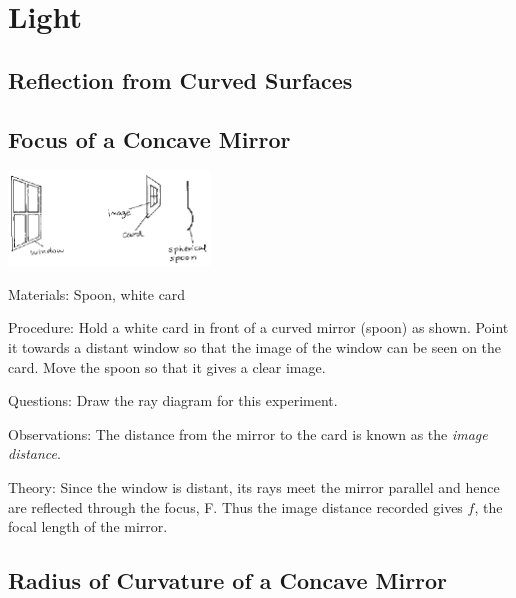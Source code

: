 \section{Light}

\begin{multicols}{2}


\section*{Reflection from Curved Surfaces}


\subsection{Focus of a Concave Mirror}

\begin{center}
\includegraphics[width=0.4\textwidth]{./img/source/focus-concave.png}
\end{center}

\begin{description*}
\item[Materials:]{Spoon, white card}
\item[Procedure:]{Hold a white card in front of a curved mirror (spoon) as shown. Point it towards a distant window so that the image of the window can be seen on the card. Move the spoon so that it gives a clear image.}
\item[Questions:]{Draw the ray diagram for this experiment.}
\item[Observations:]{The distance from the mirror to the card is known as the \emph{image distance}.}
\item[Theory:]{Since the window is distant, its rays meet the mirror parallel and hence are reflected through the focus, F. Thus the image distance recorded gives $f$, the focal length of the mirror.}
\end{description*}

\subsection{Radius of Curvature of a Concave Mirror}


\end{multicols}
